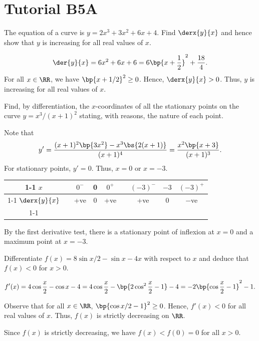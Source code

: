 \section{Tutorial B5A}

\begin{problem}
    The equation of a curve is $y=2x^3+3x^2+6x+4$. Find $\derx{y}{x}$ and hence show that $y$ is increasing for all real values of $x$.
\end{problem}
\begin{solution}
    \[\der{y}{x} = 6x^2+6x+6 = 6\bp{x + \frac12}^2 + \frac{18}4.\] For all $x \in \RR$, we have $\bp{x + 1/2}^2 \geq 0$. Hence, $\derx{y}{x} > 0$. Thus, $y$ is increasing for all real values of $x$.
\end{solution}

\begin{problem}
    Find, by differentiation, the $x$-coordinates of all the stationary points on the curve $y = x^3/(x+1)^2$ stating, with reasons, the nature of each point.
\end{problem}
\begin{solution}
    Note that \[y' = \frac{(x+1)^2\bp{3x^2} - x^3 \bs{2(x+1)}}{(x+1)^4} = \frac{x^2\bp{x+3}}{(x+1)^3}.\] For stationary points, $y' = 0$. Thus, $x = 0$ or $x = -3$.

    \begin{table}[H]
        \centering
        \begin{tabular}{|c|l|c|c|c|l|c|c|c|}
        \cline{1-1} \cline{3-5} \cline{7-9}
        $x$ &  & $0^-$ & 0 & $0^+$ &  & $(-3)^-$ & $-3$ & $(-3)^+$ \\ \cline{1-1} \cline{3-5} \cline{7-9} 
        $\derx{y}{x}$ &  & +ve & 0 & +ve &  & +ve & 0 & $-$ve \\ \cline{1-1} \cline{3-5} \cline{7-9} 
        \end{tabular}
    \end{table}

    By the first derivative test, there is a stationary point of inflexion at $x = 0$ and a maximum point at $x=-3$.
\end{solution}

\begin{problem}
    Differentiate $f(x) = 8\sin{x/2} - \sin x - 4x$ with respect to $x$ and deduce that $f(x) < 0$ for $x>0$.
\end{problem}
\begin{solution}
    \[f'(x) = 4\cos \frac{x}2 - \cos x - 4 = 4\cos \frac{x}2 - \bp{2\cos^2 \frac{x}2 - 1} - 4 = -2\bp{\cos\frac{x}2 - 1}^2 - 1.\]

    Observe that for all $x \in \RR$, $\bp{\cos{x/2} - 1}^2 \geq 0$. Hence, $f'(x) < 0$ for all real values of $x$. Thus, $f(x)$ is strictly decreasing on $\RR$.

    Since $f(x)$ is strictly decreasing, we have $f(x) < f(0) = 0$ for all $x > 0$.
\end{solution}

